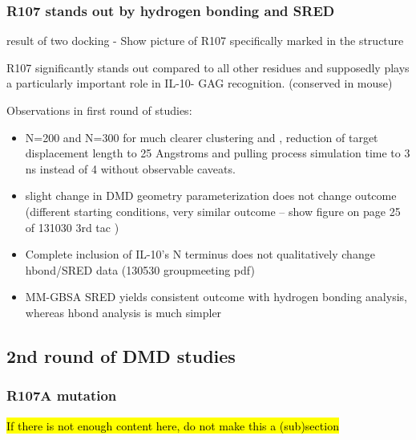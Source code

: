 \subsubsection{R107 stands out by hydrogen bonding and SRED}


result of two docking
- Show picture of R107 specifically marked in the structure


R107 significantly stands out compared to all other residues
and supposedly plays a particularly important role in IL-10-
GAG recognition.
(conserved in mouse)

Observations in first round of studies:

\begin{itemize}

\item N=200 and N=300 for much clearer clustering and , reduction of target displacement length
to 25  Angstroms and pulling process simulation time to 3 ns instead of 4 without
observable caveats.

\item slight change in DMD geometry parameterization does not change outcome (different starting conditions, very similar outcome -- show figure on page 25 of 131030 3rd tac )


\item Complete inclusion of IL-10's N terminus does not qualitatively change hbond/SRED data (130530 groupmeeting pdf)


\item MM-GBSA SRED yields consistent outcome with hydrogen bonding analysis,
whereas hbond analysis is much simpler

\end{itemize}



\subsection{2nd round of DMD studies}

\subsubsection{R107A mutation}

\hl{If there is not enough content here, do not make this a (sub)section}

